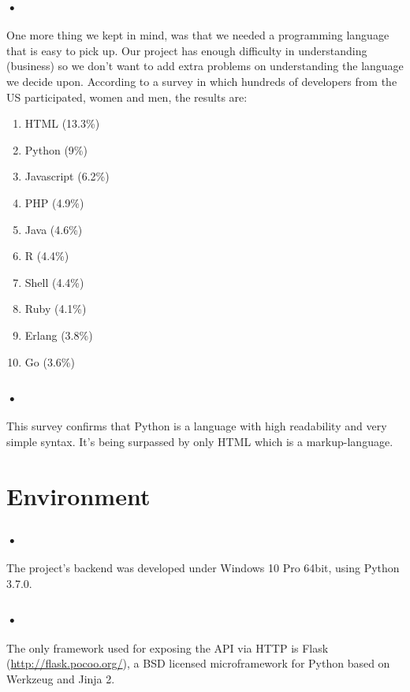 \documentclass{svproc}
\begin{document}
\pagebreak

\subsubsection{•}
One more thing we kept in mind, was that we needed a programming language that is easy to pick up. Our project has enough difficulty in understanding (business) so we don’t want to add extra problems on understanding the language we decide upon. According to a survey in which hundreds of developers from the US participated, women and men, the results are:

\begin{enumerate}
  \item HTML (13.3\%)
  \item Python (9\%)
  \item Javascript (6.2\%)
  \item PHP (4.9\%)
  \item Java (4.6\%)
  \item R (4.4\%)
  \item Shell (4.4\%)
  \item Ruby (4.1\%)
  \item Erlang (3.8\%)
  \item Go (3.6\%)
\end{enumerate}

\subsubsection{•}
This survey confirms that Python is a language with high readability and very simple syntax. It’s being surpassed by only HTML which is a markup-language. 



\section{Environment}

\subsubsection{•}
The project's backend was developed under Windows 10 Pro 64bit, using Python 3.7.0. 

\subsubsection{•}
The only framework used for exposing the API via HTTP is Flask (\url{http://flask.pocoo.org/}), a BSD licensed microframework for Python based on Werkzeug and Jinja 2.
\end{document}
